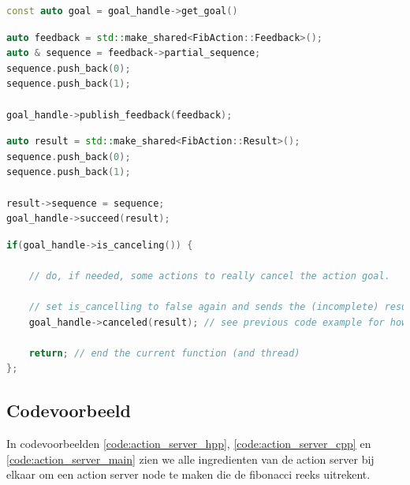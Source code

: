 \begin{lstlisting}[language=C++, caption={Gebruik van de \textit{get\_goal()} functie.}, firstnumber=0, label={code:goal_handle_getgoal}]
const auto goal = goal_handle->get_goal()
\end{lstlisting}

\begin{lstlisting}[language=C++, caption={Het versturen van feedback met een goal handle.}, firstnumber=0, label={code:goal_handle_sendfeedback}]
auto feedback = std::make_shared<FibAction::Feedback>();
auto & sequence = feedback->partial_sequence;
sequence.push_back(0);
sequence.push_back(1);

goal_handle->publish_feedback(feedback);
\end{lstlisting}

\begin{lstlisting}[language=C++, caption={Het versturen van het result met een goal handle.}, firstnumber=0, label={code:goal_handle_sendresult}]
auto result = std::make_shared<FibAction::Result>();
sequence.push_back(0);
sequence.push_back(1);

result->sequence = sequence;
goal_handle->succeed(result);
\end{lstlisting}

\begin{lstlisting}[language=C++, caption={Het controleren op een cancel request acceptatie en de afhandeling daarvan.}, firstnumber=0, label={code:goal_handle_cancel}]
if(goal_handle->is_canceling()) {

    // do, if needed, some actions to really cancel the action goal.

    // set is_cancelling to false again and sends the (incomplete) result:
    goal_handle->canceled(result); // see previous code example for how to make a result
 
    return; // end the current function (and thread)
};
\end{lstlisting}

\subsection{Codevoorbeeld}
In codevoorbeelden \ref{code:action_server_hpp}, \ref{code:action_server_cpp} en \ref{code:action_server_main} zien we alle ingredienten van de action server bij elkaar om een action server node te maken die de fibonacci reeks uitrekent.

